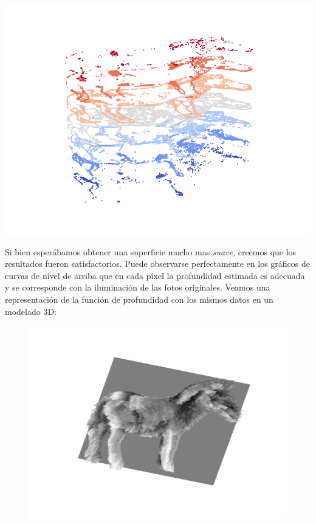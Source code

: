 {\centering
    \includegraphics[scale=0.6]{informe/imagenes/supnivel/supNivelCaballoLucesPropias578N3.pdf}
}

\newpage
Si bien esperábamos obtener una superficie mucho mas \textit{suave}, creemos que los resultados fueron satisfactorios. Puede observarse perfectamente en los gráficos de curvas de nivel de arriba que en cada píxel la profundidad estimada es adecuada y se corresponde con la iluminación de las fotos originales. Veamos una representación de la función de profundidad con los mismos datos en un modelado 3D:


{\centering
\begin{figure}[H]
    \includegraphics[scale=0.8]{informe/imagenes/profundidades/profundidadesCaballoLucesPropias578.pdf} \\
    \end{figure}
}

